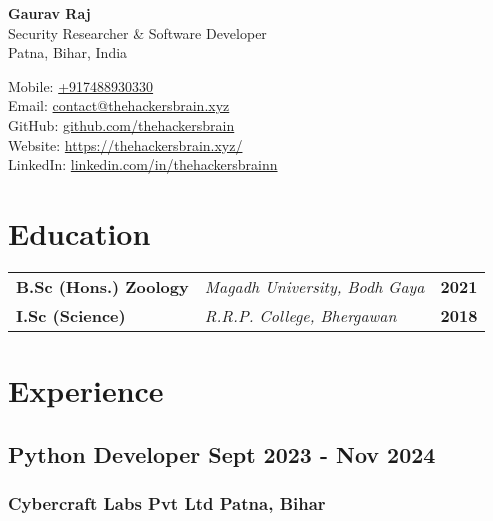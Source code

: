 \documentclass[11pt]{article} %
\begin{document}
\begin{center}
	\begin{minipage}{0.4\textwidth}
		{\Huge\bfseries
			Gaurav Raj %
		} \\ \medskip
		Security Researcher \& Software Developer \\ %
    Patna, Bihar, India
	\end{minipage} \hfill
	\begin{minipage}{0.5\textwidth}
		\raggedleft
		Mobile: \href{tel:+917488930330}{+917488930330} \\
		Email: \href{mailto:contact@thehackersbrain.xyz}{contact@thehackersbrain.xyz} \\
		GitHub: \href{https://github.com/thehackersbrain}{github.com/thehackersbrain} \\
		Website: \href{https://thehackersbrain.xyz/}{https://thehackersbrain.xyz/} \\
		LinkedIn: \href{https://www.linkedin.com/in/thehackersbrainn}{linkedin.com/in/thehackersbrainn}
	\end{minipage}
\end{center}


\section{Education}

\begin{tabular}{@{} p{} p{} r @{}}
    \textbf{B.Sc (Hons.) Zoology} & \textit{Magadh University, Bodh Gaya} & \textbf{2021} \\
    \textbf{I.Sc (Science)} & \textit{R.R.P. College, Bhergawan} & \textbf{2018} \\
\end{tabular}


\section{Experience}
\subsection{Python Developer \hfill Sept 2023 - Nov 2024}
\subsubsection{Cybercraft Labs Pvt Ltd \hfill Patna, Bihar}
\vspace{8pt}
\end{document}
